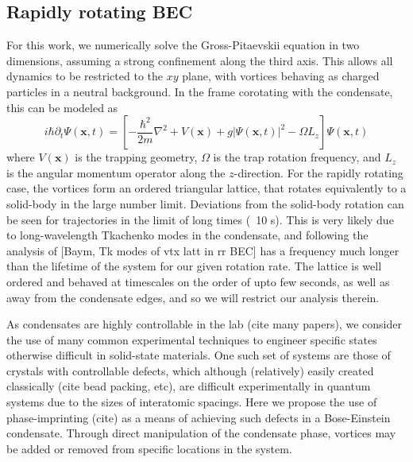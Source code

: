 \subsection{Rapidly rotating BEC}
For this work, we numerically solve the Gross-Pitaevskii equation in two dimensions, assuming a strong confinement along the third axis.
This allows all dynamics to be restricted to the $xy$ plane, with vortices behaving as charged particles in a neutral background. In the
frame corotating with the condensate, this can be modeled as
\begin{equation}
	 i\hbar\partial_t \Psi\left(\mathbf{x},t\right) = \left[ -\frac{\hbar^2}{2m}\nabla^2 + V\left(\mathbf{x}\right) + g\vert \Psi\left(\mathbf{x},t\right) \vert^2 - \Omega L_z \right]\Psi\left(\mathbf{x},t\right)
\end{equation}
where $V\left(\mathbf{x}\right)$ is the trapping geometry, $\Omega$ is the trap rotation frequency, and $L_z$ is the angular momentum
operator along the $z$-direction. For the rapidly rotating case, the vortices form an ordered triangular lattice, that rotates equivalently
to a solid-body in the large number limit. Deviations from the solid-body rotation can be seen for trajectories in the limit of long times
(~10 s). This is very likely due to long-wavelength Tkachenko modes in the condensate, and following the analysis of [Baym, Tk modes of vtx latt in rr BEC]
has a frequency much longer than the lifetime of the system for our given rotation rate.
The lattice is well ordered and behaved at timescales on the order of upto few seconds, as well as away from the condensate edges, and so we
will restrict our analysis therein.

As condensates are highly controllable in the lab (cite many papers), we consider the use of many common experimental techniques to engineer
specific states otherwise difficult in solid-state materials. One such set of systems are those of crystals with controllable defects, which
although (relatively) easily created classically (cite bead packing, etc), are difficult experimentally in quantum systems due to the sizes
of interatomic spacings. Here we propose the use of phase-imprinting (cite) as a means of achieving such defects in a Bose-Einstein
condensate. Through direct manipulation of the condensate phase, vortices may be added or removed from specific locations in the system.

